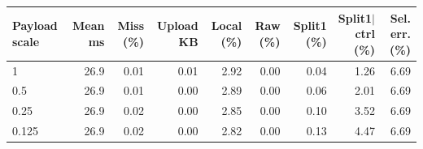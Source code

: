 \begin{tabular}{lrrrrrrrr}
\toprule
Payload scale & Mean ms & Miss (\%) & Upload KB & Local (\%) & Raw (\%) & Split1 (\%) & Split1$\mid$ctrl (\%) & Sel. err. (\%) \\
\midrule
1 & 26.9 & 0.01 & 0.01 & 2.92 & 0.00 & 0.04 & 1.26 & 6.69 \\
0.5 & 26.9 & 0.01 & 0.00 & 2.89 & 0.00 & 0.06 & 2.01 & 6.69 \\
0.25 & 26.9 & 0.02 & 0.00 & 2.85 & 0.00 & 0.10 & 3.52 & 6.69 \\
0.125 & 26.9 & 0.02 & 0.00 & 2.82 & 0.00 & 0.13 & 4.47 & 6.69 \\
\bottomrule
\end{tabular}
